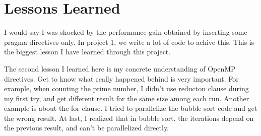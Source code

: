 \documentclass[11pt,letterpaper,oneside]{article}
\begin{document}
\section{Lessons Learned}
I would say I was shocked by the performance gain obtained by inserting some pragma directives only. In project 1, we write a lot of code to achive this. This is the biggest lesson I have learned through this project.

The second lesson I learned here is my concrete understanding of OpenMP directives. Get to know what really happened behind is very important. For example, when counting the prime number, I didn't use reducton clause during my first try, and get different result for the same size among each run. Another example is about the for clause. I tried to parallelize the bubble sort code and get the wrong result. At last, I realized that in bubble sort, the iterations depend on the previous result, and can't be parallelized directly.
\end{document}
